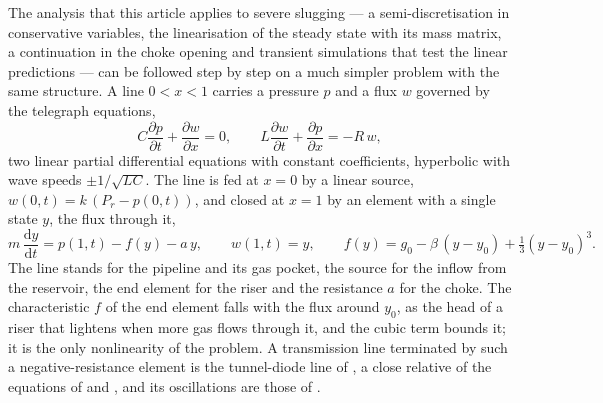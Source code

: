 \documentclass[a4paper,fleqn]{cas-sc}
\newcommand{\dd}{\mathrm{d}}
\newcommand{\pd}[2]{\frac{\partial #1}{\partial #2}}
\begin{document}
The analysis that this article applies to severe slugging --- a semi-discretisation in conservative variables, the linearisation of the steady state with its mass matrix, a continuation in the choke opening and transient simulations that test the linear predictions --- can be followed step by step on a much simpler problem with the same structure. A line $0 < x < 1$ carries a pressure $p$ and a flux $w$ governed by the telegraph equations,
\begin{equation}\label{eq:toyline}
C\pd{p}{t} + \pd{w}{x} = 0, \qquad L\pd{w}{t} + \pd{p}{x} = -R\,w,
\end{equation}
two linear partial differential equations with constant coefficients, hyperbolic with wave speeds $\pm 1/\sqrt{LC}$. The line is fed at $x = 0$ by a linear source, $w(0,t) = k\,(P_r - p(0,t))$, and closed at $x = 1$ by an element with a single state $y$, the flux through it,
\begin{equation}\label{eq:toyend}
m\,\frac{\dd y}{\dd t} = p(1,t) - f(y) - a\,y, \qquad w(1,t) = y, \qquad f(y) = g_0 - \beta\,(y - y_0) + \tfrac{1}{3}(y - y_0)^3 .
\end{equation}
The line stands for the pipeline and its gas pocket, the source for the inflow from the reservoir, the end element for the riser and the resistance $a$ for the choke. The characteristic $f$ of the end element falls with the flux around $y_0$, as the head of a riser that lightens when more gas flows through it, and the cubic term bounds it; it is the only nonlinearity of the problem. A transmission line terminated by such a negative-resistance element is the tunnel-diode line of \citet{nagumo1961}, a close relative of the equations of \citet{fitzhugh1961} and \citet{nagumo1962}, and its oscillations are those of \citet{vanderpol1926}.
\end{document}
